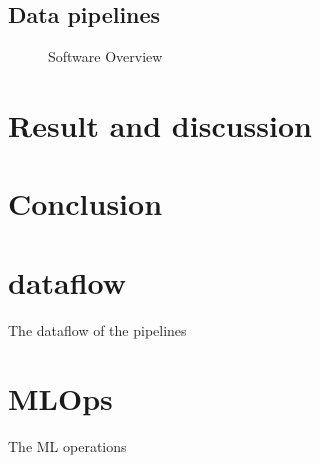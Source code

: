 \documentclass{article}
\begin{document}
\subsection{Data pipelines}

\begin{figure}[ht]
	\centering
	\def\svgwidth{0.8\columnwidth}
	
	\caption{\label{fig:label} Software Overview}
\end{figure}


\section{Result and discussion}
\label{sec:result}


\section{Conclusion}
\label{sec:conclusion}

\begin{appendices}
	\section{dataflow}
	The dataflow of the pipelines
	\section{MLOps}
	The ML operations
\end{appendices}
%
%





\printbibliography
\end{document}
